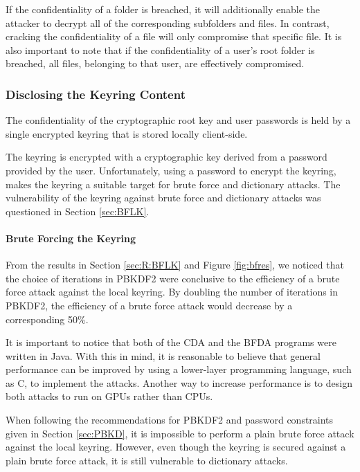 \documentclass[pdftex,english,10pt,b5paper,twoside]{book}
\begin{document}
If the confidentiality of a folder is breached, it will additionally enable the
attacker to decrypt all of the corresponding subfolders and files. In
contrast, cracking the confidentiality of a file will only compromise that
specific file. It is also important to note that if the confidentiality of a
user's root folder is breached, all files, belonging to that user, are
effectively compromised.

\subsubsection{Disclosing the Keyring Content}

The confidentiality of the cryptographic root key and user passwords is held by
a single encrypted keyring that is stored locally client-side.

The keyring is encrypted with a cryptographic key derived from a password
provided by the user. Unfortunately, using a password to encrypt the keyring,
makes the keyring a suitable target for brute force and dictionary attacks. The
vulnerability of the keyring against brute force and dictionary attacks was
questioned in Section \ref{sec:BFLK}.

\paragraph{Brute Forcing the Keyring} From the results in Section
\ref{sec:R:BFLK} and Figure \ref{fig:bfres}, we noticed that the choice of
iterations in \ac{PBKDF2} were conclusive to the efficiency of a brute force
attack against the local keyring. By doubling the number of iterations in
\ac{PBKDF2}, the efficiency of a brute force attack would decrease by a
corresponding 50\%.

It is important to notice that both of the \ac{CDA} and the \ac{BFDA} programs
were written in Java. With this in mind, it is reasonable to believe that
general performance can be improved by using a lower-layer programming
language, such as C, to implement the attacks. Another way to increase
performance is to design both attacks to run on \acp{GPU} rather than
\acp{CPU}.

When following the recommendations for \ac{PBKDF2} and password constraints
given in Section \ref{sec:PBKD}, it is impossible to perform a plain brute
force attack against the local keyring. However, even though the keyring is
secured against a plain brute force attack, it is still vulnerable to
dictionary attacks.
\end{document}
